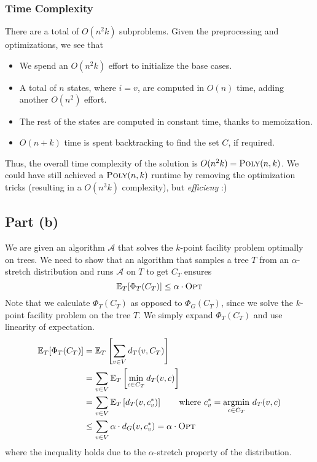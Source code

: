 \documentclass[9pt]{article}
\begin{document}
\subsubsection*{Time Complexity}
There are a total of $O(n^{2} k)$ subproblems. Given the preprocessing and optimizations, we
see that
\begin{itemize}
    \item We spend an $O(n^{2} k)$ effort to initialize the base cases.
    \item A total of $n$ states, where $i = v$, are computed in $O(n)$ time, adding another
    $O(n^{2})$ effort.
    \item The rest of the states are computed in constant time, thanks to memoization.
    \item $O(n + k)$ time is spent backtracking to find the set $C$, if required.
\end{itemize}
Thus, the overall time complexity of the solution is $O(n^{2} k) = \textsc{Poly}(n, k)$.
We could have still achieved a $\textsc{Poly}(n, k)$ runtime by removing the
optimization tricks (resulting in a $O(n^{3} k)$ complexity), but \textit{efficieny} :)

\subsection*{Part (b)}
We are given an algorithm $\mathcal{A}$ that solves the $k$-point facility problem optimally
on trees. We need to show that an algorithm that samples a tree $T$ from an $\alpha$-stretch
distribution and runs $\mathcal{A}$ on $T$ to get $C_{T}$ ensures
\begin{equation}
    \mathbb{E}_{T}[\Phi_{T}(C_{T})] \leq \alpha \cdot \textsc{Opt}
\end{equation}
Note that we calculate $\Phi_{T}(C_{T})$ as opposed to $\Phi_{G}(C_{T})$, since we solve the
$k$-point facility problem on the tree $T$. We simply expand $\Phi_{T}(C_{T})$ and use
linearity of expectation.
\begin{align}
    \begin{split}
        \mathbb{E}_{T}[\Phi_{T}(C_{T})] &= \mathbb{E}_{T} \left[ \sum_{v \in V} d_{T}(v, C_{T}) \right] \\
        &= \sum_{v \in V} \mathbb{E}_{T} \left[ \min_{c \in C_{T}} d_{T}(v, c) \right] \\
        &= \sum_{v \in V} \mathbb{E}_{T} \left[ d_{T}(v, c^{*}_{v}) \right]
        \qquad \text{where } c^{*}_{v} = \underset{c \in C_{T}}{\text{argmin}} \ d_{T}(v, c) \\
        &\leq \sum_{v \in V} \alpha \cdot d_{G}(v, c^{*}_{v})
        = \alpha \cdot \textsc{Opt}
    \end{split}
\end{align}
where the inequality holds due to the $\alpha$-stretch property of the distribution.
\end{document}
